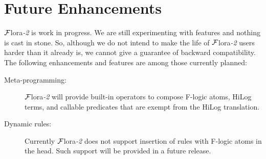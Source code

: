 \documentclass[11pt]{article}
\newcommand{\FLORA}{{\mbox{${\cal F}${\sc lora}\rm\emph{-2}}}\xspace}
\newcommand{\fl}{\mbox{F-logic}\xspace}
\begin{document}
\section{Future Enhancements}

\FLORA is work in progress. We are still experimenting with features and
nothing is cast in stone. So, although we do not intend to make the life of 
\FLORA users harder than it already is, we cannot give a guarantee of
backward compatibility. The following enhancements and features are among
those currently planned:

\begin{description}
  \item[Meta-programming:] \FLORA will provide built-in operators to compose \fl
    atoms, HiLog terms, and callable predicates that are exempt from the
    HiLog translation.

  \item[Dynamic rules:] Currently \FLORA does not support insertion of
    rules with \fl atoms in the head. Such support will be provided in
    a future release.
\end{description}




\printindex
\end{document}
